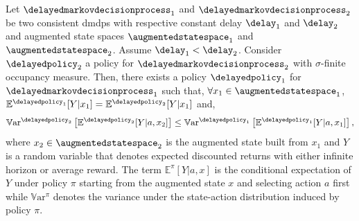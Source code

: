 \begin{prop}
\label{pp:var_ismmdp}
    Let $\delayedmarkovdecisionprocess_{1}$ and $\delayedmarkovdecisionprocess_{2}$ be two consistent \glspl{dmdp} with respective constant delay $\delay_1$ and $\delay_2$ and augmented state spaces $\augmentedstatespace_1$ and $\augmentedstatespace_2$. 
    Assume $\delay_1<\delay_2$.
    Consider $\delayedpolicy_2$ a policy for $\delayedmarkovdecisionprocess_{2}$ with $\sigma$-finite occupancy measure.
    Then, there exists a policy $\delayedpolicy_1$ for $\delayedmarkovdecisionprocess_{1}$ such that, $\forall x_1\in\augmentedstatespace_1$,
    $\mathbb{E}^{\delayedpolicy_1}[Y\vert
    x_1]=\mathbb{E}^{\delayedpolicy_2}[Y\vert x_1]$ and,
    \begin{align*}
         \mathbb{V}\mathrm{ar}^{\delayedpolicy_2}\left[\mathbb{E}^{\delayedpolicy_2}[Y\vert a,x_2]\right]\le\mathbb{V}\mathrm{ar}^{\delayedpolicy_1}\left[\mathbb{E}^{\delayedpolicy_1}[Y\vert a,x_1]\right],
    \end{align*}
    where $x_2\in\augmentedstatespace_2$ is the augmented state built from $x_1$ and $Y$ is a random variable that denotes expected discounted returns with either infinite horizon or average reward. 
    The term $\mathbb{E}^{\pi}[Y\vert a,x]$ is the conditional expectation of $Y$ under policy $\pi$ starting from the augmented state $x$ and selecting action $a$ first while $\mathbb{V}\mathrm{ar}^{\pi}$ denotes the variance under the state-action distribution induced by policy $\pi$.
\end{prop}
